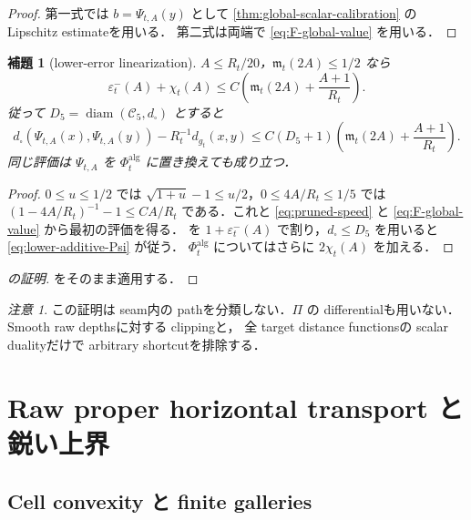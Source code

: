 \documentclass[a4paper,11pt]{ltjsarticle}
\numberwithin{equation}{section}
\theoremstyle{plain}
\newtheorem{lemma}[lemma]{補題}
\theoremstyle{definition}
\theoremstyle{remark}
\newtheorem{remark}[remark]{注意}
\newcommand{\cC}{\mathcal C}
\newcommand{\eps}{\varepsilon}
\newcommand{\diam}{\operatorname{diam}}
\begin{document}
\begin{proof}
第一式では $b=\Psi_{t,A}(y)$ として \cref{thm:global-scalar-calibration} の Lipschitz estimateを用いる．
第二式は両端で \cref{eq:F-global-value} を用いる．
\end{proof}

\begin{lemma}[lower-error linearization]\label{lem:lower-error-linearization}
$A\le R_t/20$，$\mathfrak m_t(2A)\le1/2$ なら
\begin{equation}\label{eq:lower-error-linearization}
 \eps^-_t(A)+\chi_t(A)
 \le C\left(\mathfrak m_t(2A)+\frac{A+1}{R_t}\right).
\end{equation}
従って $D_5=\diam(\cC_5,d_\square)$ とすると
\begin{equation}\label{eq:lower-additive-Psi}
 d_\square(\Psi_{t,A}(x),\Psi_{t,A}(y))-R_t^{-1}d_{g_t}(x,y)
 \le C(D_5+1)\left(\mathfrak m_t(2A)+\frac{A+1}{R_t}\right).
\end{equation}
同じ評価は $\Psi_{t,A}$ を $\Phi_t^{\mathrm{alg}}$ に置き換えても成り立つ．
\end{lemma}

\begin{proof}
$0\le u\le1/2$ では $\sqrt{1+u}-1\le u/2$，$0\le4A/R_t\le1/5$ では
$(1-4A/R_t)^{-1}-1\le C A/R_t$ である．これと \cref{eq:pruned-speed} と \cref{eq:F-global-value} から最初の評価を得る．
 を $1+\eps^-_t(A)$ で割り，$d_\square\le D_5$ を用いると \eqref{eq:lower-additive-Psi} が従う．
$\Phi_t^{\mathrm{alg}}$ についてはさらに $2\chi_t(A)$ を加える．
\end{proof}

\begin{proof}[ の証明]
 をそのまま適用する．
\end{proof}

\begin{remark}
この証明は seam内の pathを分類しない．$\Pi$ の differentialも用いない．Smooth raw depthsに対する clippingと，
全 target distance functionsの scalar dualityだけで arbitrary shortcutを排除する．
\end{remark}

\section{Raw proper horizontal transport と鋭い上界}\label{sec:upper}

\subsection{Cell convexity と finite galleries}
\end{document}
